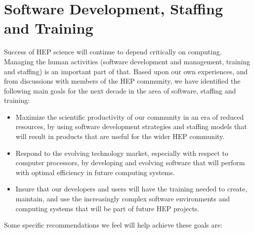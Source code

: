 \section{Software Development, Staffing and Training}

Success of HEP science will continue to depend critically on computing.
Managing the human activities (software development and management,
training and staffing) is an important part of that.  
Based upon our own experiences, and from
discussions with members of the HEP community,
we have identified the following main goals for the next decade in the area
of software, staffing and training:

\begin{itemize}
\item Maximize the scientific productivity of our community
in an era of reduced resources, by using
software development strategies and staffing models that will result in products
that are useful for the wider HEP community.
\item Respond to the evolving technology market, especially
with respect to computer processors, by
developing and evolving software that will perform with optimal efficiency
in future computing systems.
\item Insure that our developers and users will have the
training needed to create, maintain, and use the increasingly complex software
environments and computing systems that will be part of future HEP projects.
\end{itemize}

Some specific recommendations we feel will help achieve these goals are:

